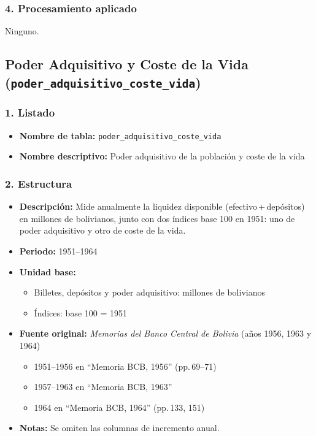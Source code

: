 \documentclass[12pt,a4paper]{article}
\begin{document}
\subsubsection*{4. Procesamiento aplicado}
Ninguno.
\subsection{Poder Adquisitivo y Coste de la Vida\\
\small(\texttt{poder\_adquisitivo\_coste\_vida})}

\subsubsection*{1. Listado}
\begin{itemize}
  \item \textbf{Nombre de tabla:} \texttt{poder\_adquisitivo\_coste\_vida}
  \item \textbf{Nombre descriptivo:} Poder adquisitivo de la población y coste de la vida
\end{itemize}

\subsubsection*{2. Estructura}
\begin{itemize}
  \item \textbf{Descripción:} Mide anualmente la liquidez disponible (efectivo\,+\,depósitos) en millones de bolivianos, junto con dos índices base 100 en 1951: uno de poder adquisitivo y otro de coste de la vida.
  \item \textbf{Periodo:} 1951--1964
  \item \textbf{Unidad base:} 
    \begin{itemize}
      \item Billetes, depósitos y poder adquisitivo: millones de bolivianos  
      \item Índices: base 100 = 1951
    \end{itemize}
  \item \textbf{Fuente original:} \emph{Memorias del Banco Central de Bolivia} (años 1956, 1963 y 1964)  
    \begin{itemize}
      \item 1951--1956 en “Memoria BCB, 1956” (pp.\,69--71)  
      \item 1957--1963 en “Memoria BCB, 1963”  
      \item 1964 en “Memoria BCB, 1964” (pp.\,133, 151)
    \end{itemize}
  \item \textbf{Notas:} Se omiten las columnas de incremento anual.
\end{itemize}
\end{document}
